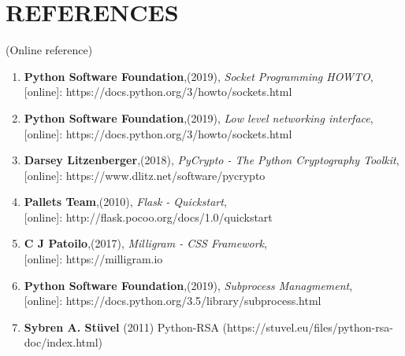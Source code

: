 \chapter*{\rm \large \bf REFERENCES}
\vspace{4.0mm}
\setlength{\parindent}{1cm} 

\scriptsize{(Online reference)}
\begin{enumerate}
    \item \textbf{Python Software Foundation},(2019),
        \textit{Socket Programming HOWTO},\\
        \hspace{15mm}[online]: https://docs.python.org/3/howto/sockets.html

    \item \textbf{Python Software Foundation},(2019),
        \textit{Low level networking interface},\\
        \hspace{15mm}[online]: https://docs.python.org/3/howto/sockets.html

    \item \textbf{Darsey Litzenberger},(2018),
        \textit{PyCrypto - The Python Cryptography Toolkit},\\
        \hspace{15mm}[online]: https://www.dlitz.net/software/pycrypto

    \item \textbf{Pallets Team},(2010),
        \textit{Flask - Quickstart},\\
        \hspace{15mm}[online]: http://flask.pocoo.org/docs/1.0/quickstart

    \item \textbf{C J Patoilo},(2017),
        \textit{Milligram - CSS Framework},\\
        \hspace{15mm}[online]: https://milligram.io

    \item \textbf{Python Software Foundation},(2019),
        \textit{Subprocess Managmement},\\
        \hspace{15mm}[online]: https://docs.python.org/3.5/library/subprocess.html

    \item \textbf{Sybren A. Stüvel} (2011) Python-RSA
        (https://stuvel.eu/files/python-rsa-doc/index.html)
\end{enumerate}

